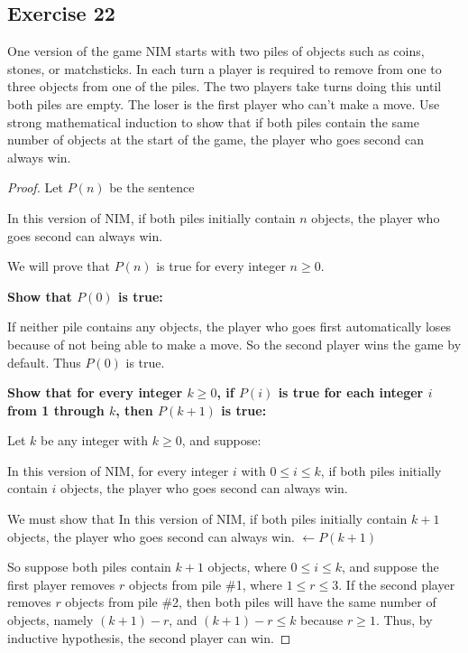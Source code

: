 \documentclass[14pt]{extarticle}
\newcommand{\from}{\leftarrow}
\newcommand{\cy}{\color{cyan}}
\begin{document}
\subsection{Exercise 22}
One version of the game NIM starts with two piles of
objects such as coins, stones, or matchsticks. In each turn
a player is required to remove from one to three objects
from one of the piles. The two players take turns doing
this until both piles are empty. The loser is the first
player who can’t make a move. Use strong mathematical
induction to show that if both piles contain the same
number of objects at the start of the game, the player who
goes second can always win.

\begin{proof}
    Let $P(n)$ be the sentence
    \begin{center}
        In this version of NIM, if both piles initially contain $n$ objects, the player who goes second can always win.
    \end{center}

    We will prove that $P(n)$ is true for every integer $n \geq 0$.

        {\bf Show that $P(0)$ is true:}

    If neither pile contains any objects, the player who goes first automatically loses because of not being able to make a move. So the second player wins the game by default. Thus $P(0)$ is true.

        {\bf Show that for every integer $k \geq 0$, if $P(i)$ is true for each integer $i$ from 1 through $k$, then $P(k + 1)$ is true:}

    Let $k$ be any integer with $k \geq 0$, and suppose:
    \begin{center}
        In this version of NIM, for every integer $i$ with $0 \leq i \leq k$,
        if both piles initially contain $i$ objects, the player who goes second can always win.
    \end{center}
    We must show that In this version of NIM, if both piles initially contain $k + 1$ objects, the player who goes second can always win. {\cy $\from P(k + 1)$}

    So suppose both piles contain $k + 1$ objects, where $0 \leq i \leq k$, and
    suppose the first player removes $r$ objects from pile \#1, where $1 \leq r \leq 3$.
    If the second player removes $r$ objects from pile \#2, then both piles will
    have the same number of objects, namely $(k + 1) - r$, and $(k + 1) - r \leq k$
    because $r \geq 1$. Thus, by inductive hypothesis, the second player can win.
\end{proof}
\end{document}
